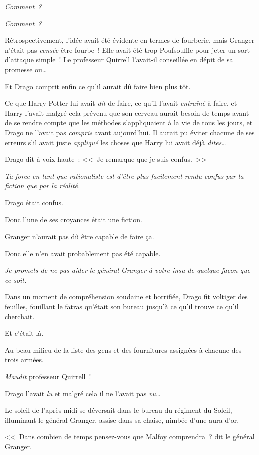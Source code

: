 \emph{Comment~?}

\emph{Comment~?}

Rétrospectivement, l'idée avait été évidente en termes de fourberie, mais Granger n'était pas \emph{censée} être fourbe~! Elle avait été trop Poufsouffle pour jeter un sort d'attaque simple~! Le professeur Quirrell l'avait-il conseillée en dépit de sa promesse ou…

Et Drago comprit enfin ce qu'il aurait dû faire bien plus tôt.

Ce que Harry Potter lui avait \emph{dit} de faire, ce qu'il l'avait \emph{entraîné} à faire, et Harry l'avait malgré cela prévenu que son cerveau aurait besoin de temps avant de se rendre compte que les méthodes s'appliquaient à la vie de tous les jours, et Drago ne l'avait pas \emph{compris} avant aujourd'hui. Il aurait pu éviter chacune de ses erreurs s'il avait juste \emph{appliqué} les choses que Harry lui avait déjà \emph{dites}…

Drago dit à voix haute~: <<~Je remarque que je suis confus.~>>

\emph{Ta force en tant que rationaliste est d'être plus facilement rendu confus par la fiction que par la réalité.}

Drago était confus.

Donc l'une de ses croyances était une fiction.

Granger n'aurait pas dû être capable de faire ça.

Donc elle n'en avait probablement pas été capable.

\emph{Je promets de ne pas aider le général Granger à votre insu de quelque façon que ce soit.}

Dans un moment de compréhension soudaine et horrifiée, Drago fit voltiger des feuilles, fouillant le fatras qu'était son bureau jusqu'à ce qu'il trouve ce qu'il cherchait.

Et c'était là.

Au beau milieu de la liste des gens et des fournitures assignées à chacune des trois armées.

\emph{Maudit} professeur Quirrell~!

Drago l'avait \emph{lu} et malgré cela il ne l'avait pas \emph{vu}…

\later

Le soleil de l'après-midi se déversait dans le bureau du régiment du Soleil, illuminant le général Granger, assise dans sa chaise, nimbée d'une aura d'or.

<<~Dans combien de temps pensez-vous que Malfoy comprendra~? dit le général Granger.

